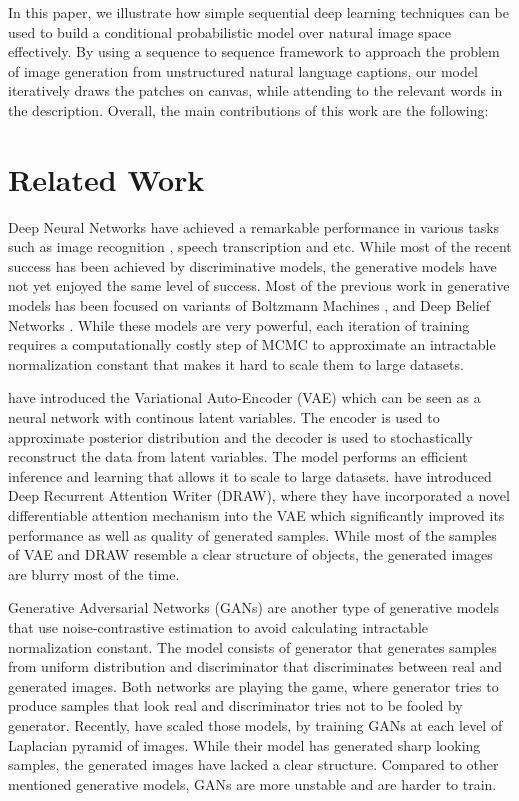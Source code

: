 \documentclass{article} %
\begin{document}
In this paper, we illustrate how simple sequential deep learning techniques can be used to build a conditional probabilistic model over natural image space effectively. By using a sequence to sequence framework to approach the problem of image generation from unstructured natural language captions, our model iteratively draws the patches on canvas, while attending to the relevant words in the description. Overall, the main contributions of this work are the following:

\section{Related Work}

Deep Neural Networks have achieved a remarkable performance in various tasks such as image recognition \citep{krizhevsky_imagenet}, speech transcription \citep{graves_speech} and etc. While most of the recent success has been achieved by discriminative models, the generative models have not yet enjoyed the same level of success. Most of the previous work in generative models has been focused on variants of Boltzmann Machines \citep{smolensky_rbm}, \citep{russ_dbm} and Deep Belief Networks \citep{hinton_dbn}. While these models are very powerful, each iteration of training requires a computationally costly step of MCMC to approximate an intractable normalization constant that makes it hard to scale them to large datasets.

\cite{kingma_vae} have introduced the Variational Auto-Encoder (VAE) which can be seen as a neural network with continous latent variables. The encoder is used to approximate posterior distribution and the decoder is used to stochastically reconstruct the data from latent variables. The model performs an efficient inference and learning that allows it to scale to large datasets. \cite{gregor_draw} have introduced Deep Recurrent Attention Writer (DRAW), where they have incorporated a novel differentiable attention mechanism into the VAE which significantly improved its performance as well as quality of generated samples. While most of the samples of VAE and DRAW resemble a clear structure of objects, the generated images are blurry most of the time.

Generative Adversarial Networks (GANs) \citep{goodfellow_gan} are another type of generative models that use noise-contrastive estimation \citep{gutmann_nce} to avoid calculating intractable normalization constant. The model consists of generator that generates samples from uniform distribution and discriminator that discriminates between real and generated images. Both networks are playing the game, where generator tries to produce samples that look real and discriminator tries not to be fooled by generator. Recently, \cite{denton_lapgan} have scaled those models, by training GANs at each level of Laplacian pyramid of images. While their model has generated sharp looking samples, the generated images have lacked a clear structure. Compared to other mentioned generative models, GANs are more unstable and are harder to train.
\end{document}
